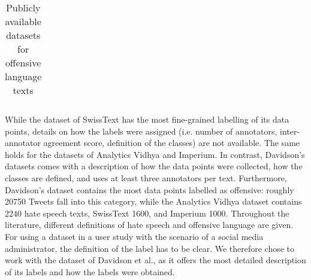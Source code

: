 \begin{table}[H]
\begin{tabular}{llll}
	\end{tabular}
	\caption{Publicly available datasets for offensive language texts}
	\label{tab:StatsAllDatasets}
\end{table}
While the dataset of SwissText has the most fine-grained labelling of its data points, details on how the labels were assigned (i.e. number of annotators, inter-annotator agreement score, definition of the classes) are not available. The same holds for the datasets of Analytics Vidhya and Imperium.\newline
In contrast, Davidson's datasets comes with a description of how the data points were collected, how the classes are defined, and uses at least three annotators per text. Furthermore, Davidson's dataset contains the most data points labelled as offensive: roughly 20750 Tweets fall into this category, while the Analytics Vidhya dataset contains 2240 hate speech texts, SwissText 1600, and Imperium 1000.\newline
Throughout the literature, different definitions of hate speech and offensive language are given. For using a dataset in a user study with the scenario of a social media administrator, the definition of the label has to be clear. We therefore chose to work with the dataset of Davidson et al., as it offers the most detailed description of its labels and how the labels were obtained.

